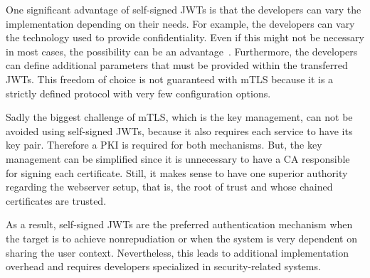 One significant advantage of self-signed JWTs is that the developers can vary the implementation depending on their needs.
For example, the developers can vary the technology used to provide confidentiality. 
Even if this might not be necessary in most cases, the possibility can be an advantage~\cite{dias2020microservices}.
Furthermore, the developers can define additional parameters that must be provided within the transferred JWTs.
This freedom of choice is not guaranteed with mTLS because it is a strictly defined protocol with very few configuration options.


Sadly the biggest challenge of mTLS, which is the key management, can not be avoided using self-signed JWTs, because it also requires each service to have its key pair.
Therefore a PKI is required for both mechanisms.
But, the key management can be simplified since it is unnecessary to have a CA responsible for signing each certificate.
Still, it makes sense to have one superior authority regarding the webserver setup, that is, the root of trust and whose chained certificates are trusted.

As a result, self-signed JWTs are the preferred authentication mechanism when the target is to achieve nonrepudiation or when the system is very dependent on sharing the user context.
Nevertheless, this leads to additional implementation overhead and requires developers specialized in security-related systems.
